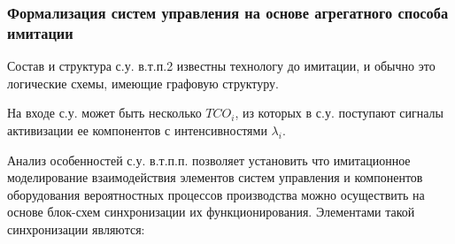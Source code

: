 \subsubsection{Формализация систем управления на основе агрегатного способа имитации}
\label{sec_chapter_enterprise_smodeling_agregate}


Состав и структура с.у. в.т.п.2 известны технологу до имитации, и обычно это логические схемы, имеющие графовую структуру.

На входе с.у. может быть несколько  $TCO_i$, из которых в с.у. поступают сигналы активизации ее компонентов с интенсивностями $\lambda_i$.


Анализ особенностей с.у. в.т.п.п. позволяет установить что имитационное моделирование взаимодействия элементов систем управления и компонентов оборудования вероятностных процессов производства можно осуществить на основе блок-схем синхронизации их функционирования. Элементами такой синхронизации являются:
